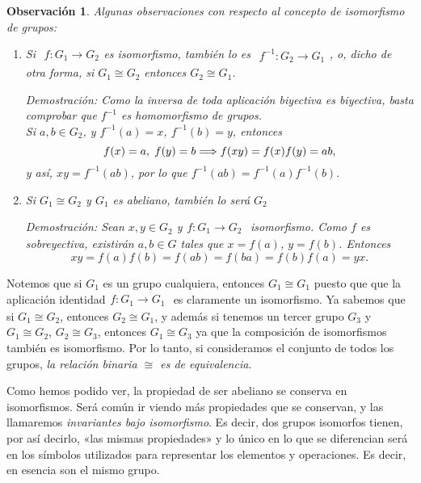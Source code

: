 \documentclass[12pt]{article}
\newtheorem{observation}{Observación}[theorem]
\begin{document}
\begin{observation} Algunas observaciones con respecto al concepto de isomorfismo de grupos:
\begin{enumerate}
\item Si $
\begin{array}{rccl}
f\colon G_{1} \longrightarrow  G_{2}
\end{array}
$es isomorfismo, también lo es $
\begin{array}{rccl}
f^{-1}\colon G_{2} \longrightarrow  G_{1}
\end{array}
$, o, dicho de otra forma, si $G_{1}\cong G_{2}$ entonces $G_{2}\cong G_{1}$.

\emph{Demostración: }Como la inversa de toda aplicación biyectiva es biyectiva, basta comprobar que $f^{-1}$ es homomorfismo de grupos.\vspace{0.2cm}\\
Si $a,b \in G_{2}$, y $f^{-1}(a)= x$, $f^{-1}(b) = y$, entonces $$f(x) = a, \hspace{0.1cm} f(y) = b\Longrightarrow f(xy) = f(x)f(y) = ab,$$ y así, $xy = f^{-1}(ab)$, por lo que $f^{-1}(ab) = f^{-1}(a)f^{-1}(b).$
\item Si $G_{1}\cong G_{2}$ y $G_{1}$ es abeliano, también lo será $G_{2}$

\emph{Demostración: }Sean $x,y \in G_{2}$ y$
\begin{array}{rccl}
f\colon G_{1} \longrightarrow  G_{2}
\end{array}
$ isomorfismo. Como $f$ es sobreyectiva, existirán $a,b \in G$ tales que $x = f(a)$, $y = f(b)$. Entonces $$xy = f(a)f(b) = f(ab) = f(ba) = f(b)f(a) = yx.$$
\end{enumerate}
\end{observation}

Notemos que si $G_{1}$ es un grupo cualquiera, entonces $G_{1} \cong G_{1}$ puesto que que la aplicación identidad$
\begin{array}{rccl}
f\colon G_{1} \longrightarrow  G_{1}
\end{array}
$ es claramente un isomorfismo. Ya sabemos que si $G_{1}\cong G_{2}$, entonces $G_{2} \cong G_{1}$, y además si tenemos un tercer grupo $G_{3}$ y $G_{1} \cong G_{2}$, $G_{2} \cong G_{3}$, entonces $G_{1} \cong G_{3}$ ya que la composición de isomorfismos también es isomorfismo. Por lo tanto, si consideramos el conjunto de todos los grupos, \textit{la relación binaria $\cong$ es de equivalencia}.

Como hemos podido ver, la propiedad de ser abeliano se conserva en isomorfismos. Será común ir viendo más propiedades que se conservan, y las llamaremos \textit{invariantes bajo isomorfismo}. Es decir, dos grupos isomorfos tienen, por así decirlo, «las mismas propiedades» y lo único en lo que se diferencian será en los símbolos utilizados para representar los elementos y operaciones. Es decir, en esencia son el mismo grupo.
\end{document}
